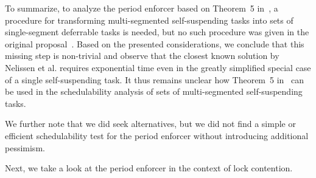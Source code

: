 To summarize, to analyze the period enforcer based on Theorem~5 in~\cite{Raj:suspension1991}, a procedure for transforming multi-segmented self-suspending tasks into sets of single-segment deferrable tasks is needed, but no such procedure was given in the original proposal~\cite{Raj:suspension1991}. Based on the presented considerations, we conclude that this missing step is non-trivial and observe that the closest known solution by Nelissen et al. \cite{ecrts15nelissen} requires exponential time even in the greatly simplified special case of a single self-suspending task. It thus remains unclear how Theorem~5 in~\cite{Raj:suspension1991} can be used in the schedulability analysis of sets of multi-segmented self-suspending tasks. 

We further note that we did seek alternatives, but we did not find a simple or efficient schedulability test for the period enforcer without introducing additional pessimism.

Next, we take a look at the period enforcer in the context of lock contention.




